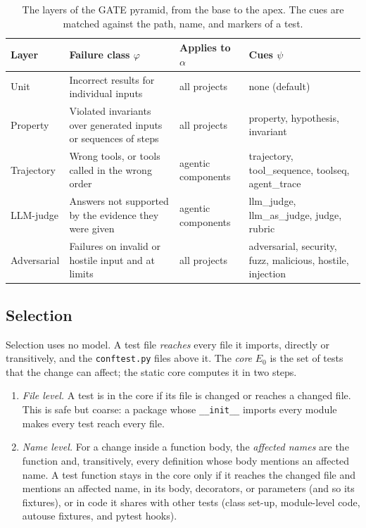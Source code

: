 \documentclass[conference]{IEEEtran}
\providecommand{\tightlist}{\setlength{\itemsep}{0pt}\setlength{\parskip}{0pt}}
\begin{document}
\begin{table}[t]
\caption{The layers of the GATE pyramid, from the base to the apex. The cues are matched against the path, name, and markers of a test.}
\centering\scriptsize
\begin{tabularx}{\textwidth}{>{\raggedright\arraybackslash}X>{\raggedright\arraybackslash}X>{\raggedright\arraybackslash}X>{\raggedright\arraybackslash}X}
\toprule
\textbf{Layer} & \textbf{Failure class \(\varphi\)} & \textbf{Applies to \(\alpha\)} & \textbf{Cues \(\psi\)} \\
\midrule
Unit & Incorrect results for individual inputs & all projects & none (default) \\
Property & Violated invariants over generated inputs or sequences of steps & all projects & property, hypothesis, invariant \\
Trajectory & Wrong tools, or tools called in the wrong order & agentic components & trajectory, tool\_sequence, toolseq, agent\_trace \\
LLM-judge & Answers not supported by the evidence they were given & agentic components & llm\_judge, llm\_as\_judge, judge, rubric \\
Adversarial & Failures on invalid or hostile input and at limits & all projects & adversarial, security, fuzz, malicious, hostile, injection \\
\bottomrule
\end{tabularx}
\end{table}

\subsection{Selection}\label{selection}

Selection uses no model. A test file \emph{reaches} every file it imports, directly or transitively, and the \texttt{conftest.py} files above it. The \emph{core} \(E_0\) is the set of tests that the change can affect; the static core computes it in two steps.

\begin{enumerate}
\def\labelenumi{\arabic{enumi}.}
\tightlist
\item
  \emph{File level.} A test is in the core if its file is changed or reaches a changed file. This is safe but coarse: a package whose \texttt{\_\_init\_\_} imports every module makes every test reach every file.
\item
  \emph{Name level.} For a change inside a function body, the \emph{affected names} are the function and, transitively, every definition whose body mentions an affected name. A test function stays in the core only if it reaches the changed file and mentions an affected name, in its body, decorators, or parameters (and so its fixtures), or in code it shares with other tests (class set-up, module-level code, autouse fixtures, and pytest hooks).
\end{enumerate}
\end{document}
